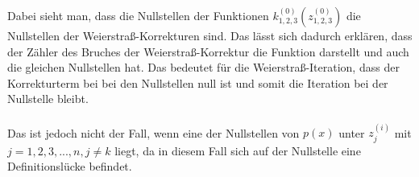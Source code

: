 \documentclass[12pt]{article}
\begin{document}
Dabei sieht man, dass die Nullstellen der Funktionen $k_{1,2,3}^{(0)}(z_{1,2,3}^{(0)})$ die Nullstellen der Weierstraß-Korrekturen sind. Das lässt sich dadurch erklären, dass der Zähler des Bruches der Weierstraß-Korrektur die Funktion darstellt und auch die gleichen Nullstellen hat. Das bedeutet für die Weierstraß-Iteration, dass der Korrekturterm bei bei den Nullstellen null ist und somit die Iteration bei der Nullstelle bleibt.\\\\
Das ist jedoch nicht der Fall, wenn eine der Nullstellen von $p(x)$ unter $z_j^{(i)}$ mit $j=1,2,3,...,n, j \neq k$ liegt, da in diesem Fall sich auf der Nullstelle eine Definitionslücke befindet.
\end{document}
